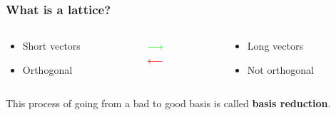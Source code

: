 \documentclass[
aspectratio=169, %
t, %
onlytextwidth, %
10pt, %
]{beamer}
\begin{document}

\begin{frame}
    \frametitle{What is a lattice?}
    \begin{columns}[T]
        \begin{column}{0.33\linewidth}
            \begin{center}
                \begin{tcolorbox}[colback=ICLBlue!5!white,colframe=ICLBlue,title=\textbf{Good Basis}]
            \begin{itemize}
                \item Short vectors
                \item Orthogonal
            \end{itemize}
            \end{tcolorbox}
            \end{center}
        \end{column}
        \begin{column}{0.33\linewidth}
            \begin{center}
                \Huge
                \(\color{green}\longrightarrow\)\\
                \vspace{20pt}
                \(\color{red}\longleftarrow\)
                \normalsize
            \end{center}
        \end{column}
        \begin{column}{0.33\linewidth}
            \begin{center}
                \begin{tcolorbox}[colback=ICLBlue!5!white,colframe=ICLBlue,title=\textbf{Bad Basis}]
            \begin{itemize}
                \item Long vectors
                \item Not orthogonal
            \end{itemize}
            \end{tcolorbox}
            \end{center}
        \end{column}
    \end{columns}
    This process of going from a bad to good basis is called \textbf{basis reduction}.
    \begin{columns}
        \begin{column}{0.33\linewidth}
                \begin{tcolorbox}[colback=ICLBlue!5!white,colframe=ICLBlue,title=\textbf{LLL}]

\end{tcolorbox}
\end{column}
\end{columns}
\end{frame}
\end{document}
